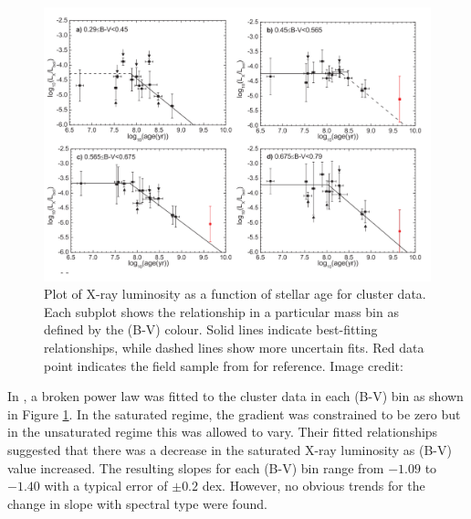 \begin{figure}
    \centering
    \includegraphics[scale=0.45]{Figures/2-Historical_overview/jackson_etal_2012_part.pdf}
    \caption{Plot of X-ray luminosity as a function of stellar age for cluster data. Each subplot shows the relationship in a particular mass bin as defined by the (B-V) colour. Solid lines indicate best-fitting relationships, while dashed lines show more uncertain fits. Red data point indicates the field sample from \citet{Pizzolato_etal_2003} for reference. Image credit: \citet{Jackson_etal_2012}}
    \label{fig:jackson_etal_2012_plot}
\end{figure}

In \citet{Jackson_etal_2012}, a broken power law was fitted to the cluster data in each (B-V) bin as shown in Figure \ref{fig:jackson_etal_2012_plot}. In the saturated regime, the gradient was constrained to be zero but in the unsaturated regime this was allowed to vary. Their fitted relationships suggested that there was a decrease in the saturated X-ray luminosity as (B-V) value increased. The resulting slopes for each (B-V) bin range from $-1.09$ to $-1.40$ with a typical error of $\pm 0.2$ dex. However, no obvious trends for the change in slope with spectral type were found.

